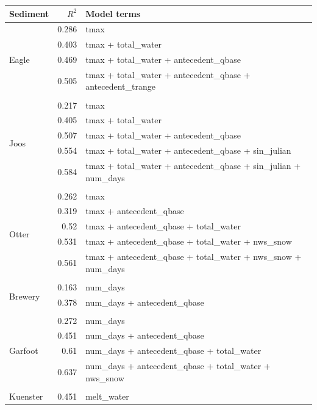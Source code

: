 \documentclass[10pt]{article}
\begin{document}
\begin{table}[h] \small
    \begin{center}
    \begin{tabular}{lrl}
    \textbf{Sediment} & $R^2$ & Model terms \\
    \hline
\multirow{5}{*}{Eagle} & 0.286 & tmax\\ 
 & 0.403 & tmax + total\_water\\ 
 & 0.469 & tmax + total\_water + antecedent\_qbase\\ 
 & 0.505 & tmax + total\_water + antecedent\_qbase + antecedent\_trange\\ 
\vspace{2mm}\\ \multirow{6}{*}{Joos} & 0.217 & tmax\\ 
 & 0.405 & tmax + total\_water\\ 
 & 0.507 & tmax + total\_water + antecedent\_qbase\\ 
 & 0.554 & tmax + total\_water + antecedent\_qbase + sin\_julian\\ 
 & 0.584 & tmax + total\_water + antecedent\_qbase + sin\_julian + num\_days\\ 
\vspace{2mm}\\ \multirow{6}{*}{Otter} & 0.262 & tmax\\ 
 & 0.319 & tmax + antecedent\_qbase\\ 
 & 0.52 & tmax + antecedent\_qbase + total\_water\\ 
 & 0.531 & tmax + antecedent\_qbase + total\_water + nws\_snow\\ 
 & 0.561 & tmax + antecedent\_qbase + total\_water + nws\_snow + num\_days\\ 
\vspace{2mm}\\ \multirow{3}{*}{Brewery} & 0.163 & num\_days\\ 
 & 0.378 & num\_days + antecedent\_qbase\\ 
\vspace{2mm}\\ \multirow{5}{*}{Garfoot} & 0.272 & num\_days\\ 
 & 0.451 & num\_days + antecedent\_qbase\\ 
 & 0.61 & num\_days + antecedent\_qbase + total\_water\\ 
 & 0.637 & num\_days + antecedent\_qbase + total\_water + nws\_snow\\ 
\vspace{2mm}\\ \multirow{4}{*}{Kuenster} & 0.451 & melt\_water\\ 

\end{tabular}
\end{center}
\end{table}
\end{document}
